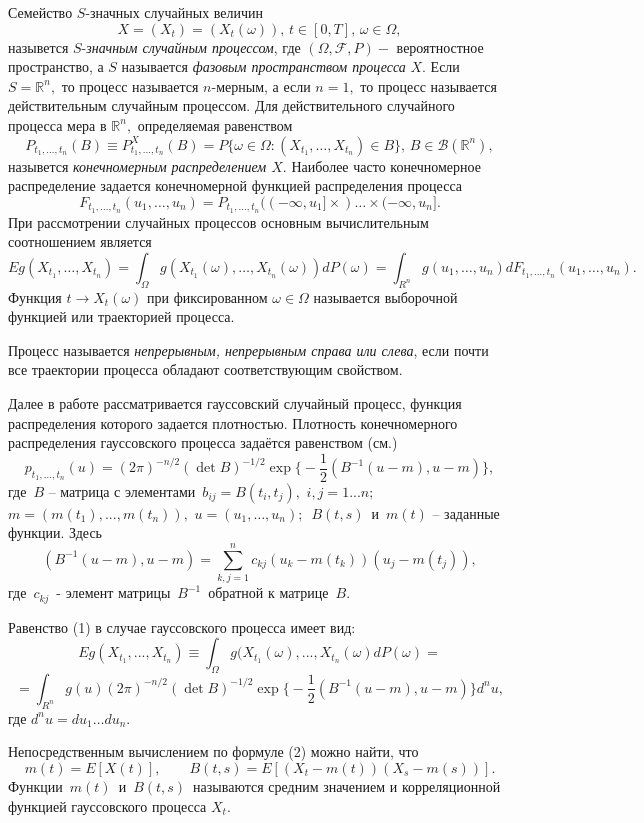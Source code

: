 \documentclass [a4paper, 12pt]{report}
\begin{document}
Семейство $S$-значных случайных величин
$$
X=(X_t)=(X_t(\omega)), \, t\in [0,T], \, \omega\in \Omega,
$$
назывется $S$-\emph{значным случайным процессом},
где $(\Omega,\mathcal{F},P)-$ вероятностное пространство, а $S$ называется
 \emph{фазовым пространством
процесса} $X.$ Если $S=\mathbb{R}^n,$ то процесс называется
$n$-мерным, а если $n=1,$ то процесс называется действительным
случайным процессом. Для действительного случайного процесса
мера в $\mathbb{R}^n,$ определяемая равенством
$$
P_{t_1,\ldots,t_n}(B)\equiv P^X_{t_1,\ldots,t_n}(B)=
P\{\omega\in \Omega:(X_{t_1},\ldots,X_{t_n})\in B\}, \,
B\in \mathcal{B}(\mathbb{R}^n),
$$
назывется \emph{конечномерным
распределением $X.$}
 Наиболее часто конечномерное распределение задается конечномерной функцией распределения процесса
$$
F_{t_1,\ldots,t_n}(u_1,\ldots,u_n)=
P_{t_1,\ldots,t_n}((-\infty,u_1]\times)\ldots\times(-\infty,u_n].
$$
При рассмотрении случайных процессов основным вычислительным соотношением
является
$$
Eg(X_{t_1},\ldots,X_{t_n})=
\int_{\Omega}g(X_{t_1}(\omega),\ldots,X_{t_n}(\omega))dP(\omega)=
\int_{R^n}g(u_1,\ldots,u_n)dF_{t_1,\ldots,t_n}(u_1,\ldots,u_n).
$$
Функция $t\rightarrow X_t(\omega)$ при фиксированном
$\omega\in \Omega$ называется выборочной функцией или траекторией
процесса.

   Процесс называется \emph{непрерывным, непрерывным справа или
слева}, если почти все траектории процесса обладают соответствующим
свойством.

Далее в работе рассматривается гауссовский случайный процесс, функция распределения которого задается плотностью.
Плотность конечномерного распределения гауссовского процесса задаётся равенством (см.\cite{lecture})
$$p_{t_1,...,t_n}(u)=
(2\pi)^{-n/2}(\det B)^{-1/2}\exp\Big\{-\frac{1}{2}(B^{-1}(u-m),u-m)\Big\},$$
где $\,B$ -- матрица с элементами $\, b_{ij}=B(t_i,t_j), \,\,i,j=1...n;$
$m=(m(t_1),...,m(t_n)),$ $u=(u_1,\ldots,u_n);$ $\,  B(t,s)\,$ и
$ \,m(t)$ -- заданные функции.
Здесь
$$(B^{-1}(u-m),u-m) = \sum_{k,j=1}^n c_{kj}(u_k-m(t_k))(u_j-m(t_j)),$$
где $\,c_{kj}\,$ - элемент матрицы $\,B^{-1}\,$ обратной к матрице $\,B.$

Равенство (1) в случае гауссовского процесса имеет вид:
$$Eg(X_{t_1},...,X_{t_n})\equiv
\int_{\Omega}g(X_{t_1}(\omega),...,X_{t_n}(\omega)dP(\omega)=
$$
$$
=\int_{R^n}g(u)(2\pi)^{-n/2}(\det B)^{-1/2}
\exp\Big\{-\frac{1}{2}(B^{-1}(u-m),u-m)\Big\}d^n u,
$$
где $d^n u=du_1\ldots du_n.$

Непосредственным вычислением по формуле (2) можно найти, что
$$m(t)=E[X(t)], \qquad B(t,s)=E[(X_t-m(t))(X_s-m(s))].$$
Функции $\,m(t)\,$ и $\,B(t,s)\,$ называются средним значением и
корреляционной функцией гауссовского процесса $X_t.$
\end{document}
